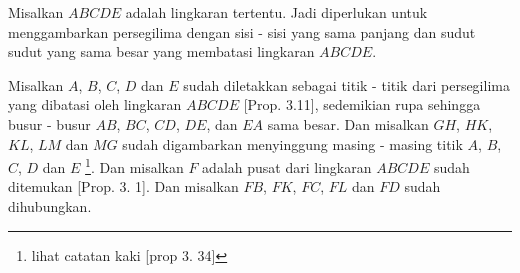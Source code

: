 \documentclass[a4paper]{book}
\begin{document}
\begin{center}
\end{center}

Misalkan $ABCDE$ adalah lingkaran tertentu. Jadi diperlukan untuk 
menggambarkan persegilima dengan sisi - sisi yang sama panjang dan sudut
sudut yang sama besar yang membatasi lingkaran $ABCDE$.

Misalkan $A$, $B$, $C$, $D$ dan $E$ sudah diletakkan sebagai titik - titik
dari persegilima yang dibatasi oleh lingkaran $ABCDE$ [Prop. 3.11], 
sedemikian rupa sehingga busur - busur $AB$, $BC$, $CD$, $DE$, dan $EA$
sama besar. Dan misalkan $GH$, $HK$, $KL$, $LM$ dan $MG$ sudah digambarkan
menyinggung masing - masing titik $A$, $B$, $C$, $D$ dan $E$ \footnote{lihat catatan kaki [prop 3. 34]}. Dan misalkan $F$ adalah pusat dari 
lingkaran $ABCDE$ sudah ditemukan [Prop. 3. 1]. 
Dan misalkan $FB$, $FK$, $FC$, $FL$ dan $FD$ sudah dihubungkan.
\end{document}
